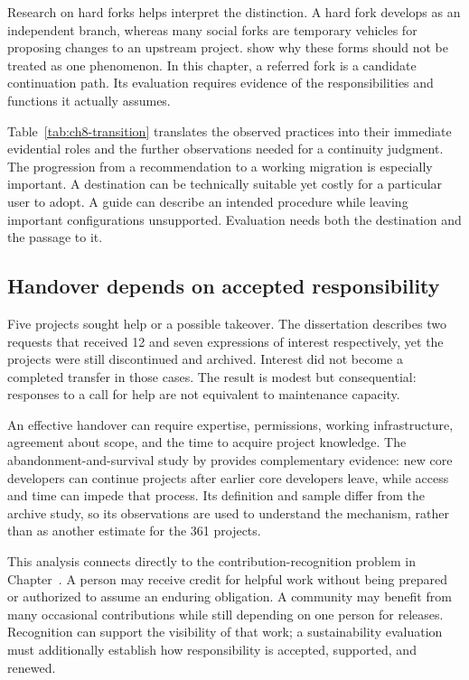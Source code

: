 Research on hard forks helps interpret the distinction. A hard fork develops as an independent branch, whereas many social forks are temporary vehicles for proposing changes to an upstream project. \citet{zhou2020forks} show why these forms should not be treated as one phenomenon. In this chapter, a referred fork is a candidate continuation path. Its evaluation requires evidence of the responsibilities and functions it actually assumes.

Table~\ref{tab:ch8-transition} translates the observed practices into their immediate evidential roles and the further observations needed for a continuity judgment. The progression from a recommendation to a working migration is especially important. A destination can be technically suitable yet costly for a particular user to adopt. A guide can describe an intended procedure while leaving important configurations unsupported. Evaluation needs both the destination and the passage to it.



\subsection{Handover depends on accepted responsibility}
Five projects sought help or a possible takeover. The dissertation describes two requests that received 12 and seven expressions of interest respectively, yet the projects were still discontinued and archived. Interest did not become a completed transfer in those cases. The result is modest but consequential: responses to a call for help are not equivalent to maintenance capacity.

An effective handover can require expertise, permissions, working infrastructure, agreement about scope, and the time to acquire project knowledge. The abandonment-and-survival study by \citet{avelino2019} provides complementary evidence: new core developers can continue projects after earlier core developers leave, while access and time can impede that process. Its definition and sample differ from the archive study, so its observations are used to understand the mechanism, rather than as another estimate for the 361 projects.

This analysis connects directly to the contribution-recognition problem in Chapter~. A person may receive credit for helpful work without being prepared or authorized to assume an enduring obligation. A community may benefit from many occasional contributions while still depending on one person for releases. Recognition can support the visibility of that work; a sustainability evaluation must additionally establish how responsibility is accepted, supported, and renewed.

